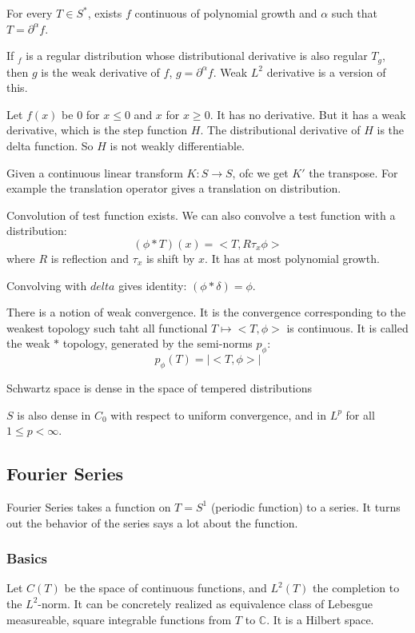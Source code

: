 \documentclass[main.tex]{subfiles}
\begin{document}
\begin{theorem}
For every $T \in S^*$, exists $f$ continuous of polynomial growth and $\alpha$ such that $T = \partial^\alpha f$.
\end{theorem}

If $_f$ is a regular distribution whose distributional derivative is also regular $T_g$, then $g$ is the weak derivative of $f$, $g = \partial^\alpha f$. Weak $L^2$ derivative is a version of this.

Let $f(x)$ be $0$ for $x \leq 0$ and $x$ for $x \geq 0$. It has no derivative. But it has a weak derivative, which is the step function $H$. The distributional derivative of $H$ is the delta function. So $H$ is not weakly differentiable.

Given a continuous linear transform $K: S \rightarrow S$, ofc we get $K'$ the transpose. For example the translation operator gives a translation on distribution.

Convolution of test function exists. We can also convolve a test function with a distribution:
$$
(\phi * T)(x) = <T, R\tau_x \phi>
$$
where $R$ is reflection and $\tau_x$ is shift by $x$. It has at most polynomial growth.

Convolving with $delta$ gives identity: $(\phi * \delta) = \phi$.

There is a notion of weak convergence. It is the convergence corresponding to the weakest topology such taht all functional $T \mapsto <T, \phi> $ is continuous. It is called the weak $*$ topology, generated by the semi-norms $p_\phi$:
$$
p_\phi(T) = |<T, \phi>|
$$

\begin{theorem}
Schwartz space is dense in the space of tempered distributions
\end{theorem}
$S$ is also dense in $C_0$ with respect to uniform convergence, and in $L^p$ for all $1 \leq p < \infty$.




\subsection{Fourier Series}
Fourier Series takes a function on $T = S^1$ (periodic function) to a series. It turns out the behavior of the series says a lot about the function.

\subsubsection{Basics}
Let $C(T)$ be the space of continuous functions, and $L^2(T)$ the completion to the $L^2$-norm.
It can be concretely realized as equivalence class of Lebesgue measureable, square integrable functions from $T$ to $\mathbb{C}$. It is a Hilbert space. 
\end{document}
